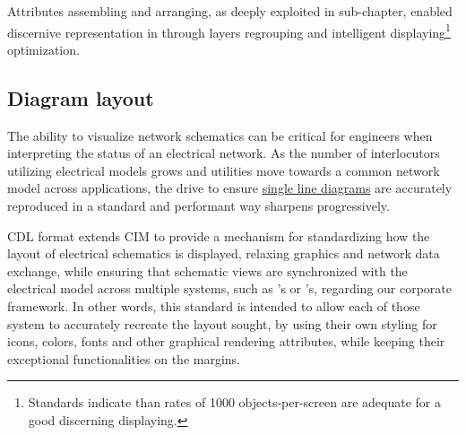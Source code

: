 Attributes assembling and arranging, as deeply exploited in  sub-chapter, enabled discernive representation in  through layers regrouping and intelligent displaying\footnote{Standards indicate than rates of 1000 objects-per-screen are adequate for a good discerning displaying.} optimization.

\subsection{Diagram layout}
\label{sec:approach:diagram_layout}

The ability to visualize network schematics can be critical for engineers when interpreting the status of an electrical network. As the number of interlocutors utilizing electrical models grows and utilities move towards a common network model across applications, the drive to ensure \hyperref[sec:approach:diagram_layout/SLD]{single line diagrams} are accurately reproduced in a standard and performant way sharpens progressively.

CDL format extends CIM to provide a mechanism for standardizing how the layout of electrical schematics is displayed, relaxing  graphics and network data exchange, while ensuring that schematic views are synchronized with the electrical model across multiple systems, such as 's or 's, regarding our corporate framework. In other words, this standard is intended to allow each of those system to accurately recreate the layout sought, by using their own styling for icons, colors, fonts and other graphical rendering attributes, while keeping their exceptional functionalities on the margins. 

